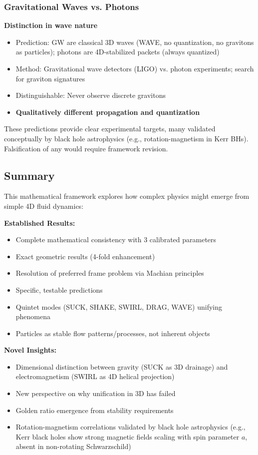 \subsubsection{Gravitational Waves vs. Photons}
\textbf{Distinction in wave nature}
\begin{itemize}
\item Prediction: GW are classical 3D waves (WAVE, no quantization, no gravitons as particles); photons are 4D-stabilized packets (always quantized)
\item Method: Gravitational wave detectors (LIGO) vs. photon experiments; search for graviton signatures
\item Distinguishable: Never observe discrete gravitons
\item \textbf{Qualitatively different propagation and quantization}
\end{itemize}

These predictions provide clear experimental targets, many validated conceptually by black hole astrophysics (e.g., rotation-magnetism in Kerr BHs). Falsification of any would require framework revision.

\subsection{Summary}

This mathematical framework explores how complex physics might emerge from simple 4D fluid dynamics:

\textbf{Established Results:}
\begin{itemize}
\item Complete mathematical consistency with 3 calibrated parameters
\item Exact geometric results (4-fold enhancement)
\item Resolution of preferred frame problem via Machian principles
\item Specific, testable predictions
\item Quintet modes (SUCK, SHAKE, SWIRL, DRAG, WAVE) unifying phenomena
\item Particles as stable flow patterns/processes, not inherent objects
\end{itemize}

\textbf{Novel Insights:}
\begin{itemize}
\item Dimensional distinction between gravity (SUCK as 3D drainage) and electromagnetism (SWIRL as 4D helical projection)
\item New perspective on why unification in 3D has failed
\item Golden ratio emergence from stability requirements
\item Rotation-magnetism correlations validated by black hole astrophysics (e.g., Kerr black holes show strong magnetic fields scaling with spin parameter $a$, absent in non-rotating Schwarzschild)
\end{itemize}

